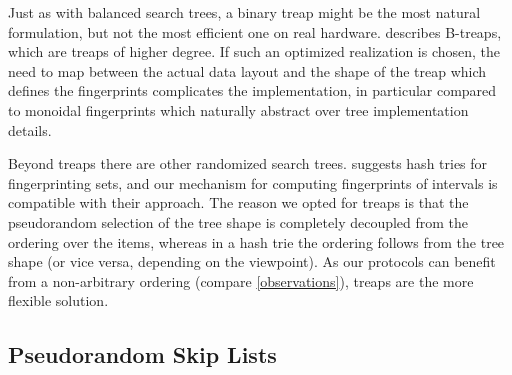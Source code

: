 Just as with balanced search trees, a binary treap might be the most natural formulation, but not the most efficient one on real hardware. \cite{golovin2009b} describes B-treaps, which are treaps of higher degree. If such an optimized realization is chosen, the need to map between the actual data layout and the shape of the treap which defines the fingerprints complicates the implementation, in particular compared to monoidal fingerprints which naturally abstract over tree implementation details.

Beyond treaps there are other randomized search trees. \cite{pugh1989incremental} suggests hash tries for fingerprinting sets, and our mechanism for computing fingerprints of intervals is compatible with their approach. The reason we opted for treaps is that the pseudorandom selection of the tree shape is completely decoupled from the ordering over the items, whereas in a hash trie the ordering follows from the tree shape (or vice versa, depending on the viewpoint). As our protocols can benefit from a non-arbitrary ordering (compare \cref{observations}), treaps are the more flexible solution.

\subsection{Pseudorandom Skip Lists}
























































